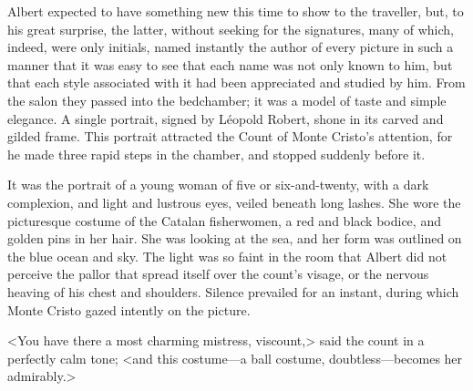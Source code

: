  Albert expected to have something new this time to show to the traveller, but, to his great surprise, the latter, without seeking for the signatures, many of which, indeed, were only initials, named instantly the author of every picture in such a manner that it was easy to see that each name was not only known to him, but that each style associated with it had been appreciated and studied by him. From the salon they passed into the bedchamber; it was a model of taste and simple elegance. A single portrait, signed by Léopold Robert, shone in its carved and gilded frame. This portrait attracted the Count of Monte Cristo's attention, for he made three rapid steps in the chamber, and stopped suddenly before it. 

 It was the portrait of a young woman of five or six-and-twenty, with a dark complexion, and light and lustrous eyes, veiled beneath long lashes. She wore the picturesque costume of the Catalan fisherwomen, a red and black bodice, and golden pins in her hair. She was looking at the sea, and her form was outlined on the blue ocean and sky. The light was so faint in the room that Albert did not perceive the pallor that spread itself over the count's visage, or the nervous heaving of his chest and shoulders. Silence prevailed for an instant, during which Monte Cristo gazed intently on the picture. 

 <You have there a most charming mistress, viscount,> said the count in a perfectly calm tone; <and this costume—a ball costume, doubtless—becomes her admirably.> 

